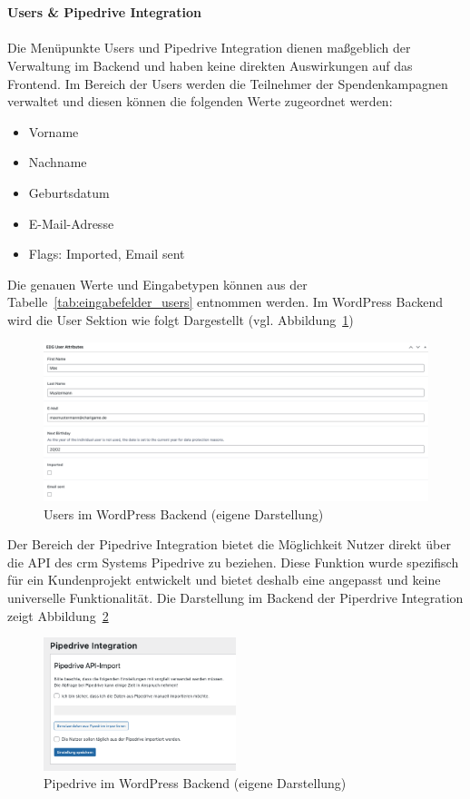 \\\\
\textbf{Users \& Pipedrive Integration}\\\\
Die Menüpunkte Users und Pipedrive Integration dienen maßgeblich der Verwaltung im Backend und haben keine direkten Auswirkungen auf das Frontend.
Im Bereich der Users werden die Teilnehmer der Spendenkampagnen verwaltet und diesen können die folgenden Werte zugeordnet werden:
\begin{itemize}
    \item Vorname
    \item Nachname
    \item Geburtsdatum
    \item E-Mail-Adresse
    \item Flags: Imported, Email sent
\end{itemize}
Die genauen Werte und Eingabetypen können aus der Tabelle~\ref{tab:eingabefelder_users} entnommen werden.
Im WordPress Backend wird die User Sektion wie folgt Dargestellt (vgl. Abbildung~\ref{fig:users-backend-legacy})

\begin{figure}[H]
    \centering
    \includegraphics[width=1\textwidth]{images/legacy_users_backend}
    \caption{Users im WordPress Backend (eigene Darstellung)}
    \label{fig:users-backend-legacy}
\end{figure}

Der Bereich der Pipedrive Integration bietet die Möglichkeit Nutzer direkt über die API des \gls{crm} Systems Pipedrive zu beziehen.
Diese Funktion wurde spezifisch für ein Kundenprojekt entwickelt und bietet deshalb eine angepasst und keine universelle Funktionalität.
Die Darstellung im Backend der Piperdrive Integration zeigt Abbildung~\ref{fig:pipedrive-backend-legacy}

\begin{figure}[H]
    \centering
    \includegraphics[width=0.5\textwidth]{images/legacy_pipedrive_backend}
    \caption{Pipedrive im WordPress Backend (eigene Darstellung)}
    \label{fig:pipedrive-backend-legacy}
\end{figure}

